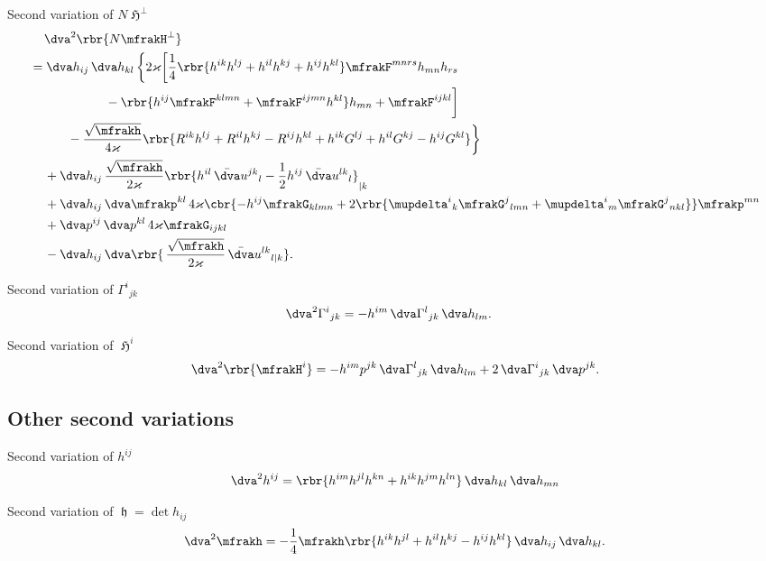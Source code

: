 \documentclass[a4paper,11pt]{article}
\begin{document}
Second variation of $N \mfrakH^\perp$
\begin{align}
&\quad\,
\dva^2\rbr{N \mfrakH^\perp}
\nonumber \\
&= \dva h_{ij}\,\dva h_{kl}\,\bigg\{ 2\varkappa\bigg[
\frac{1}{4}\rbr{h^{ik}h^{lj}+h^{il}h^{kj}+h^{ij}h^{kl}} \mfrakF^{mnrs} 
h_{mn} h_{rs}
\nonumber \\
&\qquad\qquad\qquad
-\rbr{h^{ij}\mfrakF^{klmn}+\mfrakF^{ijmn}h^{kl}}h_{mn}
+\mfrakF^{ijkl} \bigg]
\nonumber \\
&\qquad\quad
-\frac{\sqrt{\mfrakh}}{4\varkappa}\rbr{
R^{ik}h^{lj}+R^{il}h^{kj}-R^{ij}h^{kl}+h^{ik}G^{lj}+h^{il}G^{kj}-h^{ij}G^{kl}}
\bigg\}
\nonumber \\
&\quad\,
+\dva h_{ij}\,\frac{\sqrt{\mfrakh}}{2\varkappa}
\rbr{h^{il}\,\bar{\dva}u^{jk}{}_{l}
- \frac{1}{2}h^{ij}\,\bar{\dva}u^{lk}{}_{l}}_{|k} 
\nonumber \\
&\quad\,
+\dva h_{ij}\,\dva \mfrakp^{kl}\,4\varkappa
\cbr{-h^{ij}\mfrakG_{klmn}+2\rbr{\mupdelta^i{}_k\mfrakG^{j}{}_{lmn} 
+\mupdelta^i{}_m\mfrakG^{j}{}_{nkl}} } \mfrakp^{mn}
\nonumber \\
&\quad\,
+\dva p^{ij}\,\dva p^{kl}\,4\varkappa \mfrakG_{ijkl}
\nonumber \\
&\quad\,
-\dva h_{ij}\,
\dva\rbr{\,\frac{\sqrt{\mfrakh}}{2\varkappa}\,\bar{\dva}u^{lk}{}_{l|k}}.
\end{align}

Second variation of $\Gamma^i{}_{jk}$
\begin{align}
\dva^2 \Gamma^i{}_{jk} &=
- h^{im} \,\dva\Gamma^{l}{}_{jk} \,\dva h_{lm}.
\end{align}

Second variation of $\mfrakH^i$
\begin{align}
\dva^2\rbr{\mfrakH^i} = -h^{im}p^{jk}
\,\dva\Gamma^{l}{}_{jk}\,\dva h_{lm} + 2\,\dva\Gamma^{i}{}_{jk}\,\dva p^{jk}.
\end{align}


\subsection*{Other second variations}

Second variation of $h^{ij}$
\begin{align}
\dva^2 h^{ij} = \rbr{h^{im}h^{jl}h^{kn}+h^{ik}h^{jm}h^{ln}}
\,\dva h_{kl}\,\dva h_{mn}
\end{align}

Second variation of $\mfrakh = \det h_{ij}$
\begin{align}
\dva^2 \mfrakh = -\frac{1}{4} \mfrakh \rbr{
h^{ik}h^{jl}+h^{il}h^{kj}-h^{ij}h^{kl}}\,\dva h_{ij}\,\dva h_{kl}.
\end{align}
\end{document}
